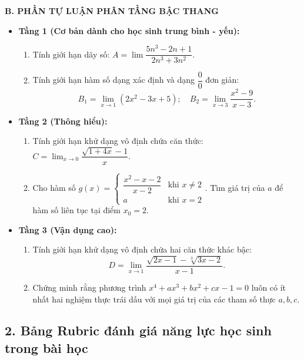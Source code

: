\documentclass[12pt, a4paper]{article}
\begin{document}
\noindent \textbf{B. PHẦN TỰ LUẬN PHÂN TẦNG BẬC THANG}
\begin{itemize}[leftmargin=0.6cm]
    \item \textbf{Tầng 1 (Cơ bản dành cho học sinh trung bình - yếu):}
    \begin{enumerate}[leftmargin=0.5cm]
        \item Tính giới hạn dãy số: $A = \lim \dfrac{5n^3 - 2n + 1}{2n^3 + 3n^2}$.
        \item Tính giới hạn hàm số dạng xác định và dạng $\dfrac{0}{0}$ đơn giản:
        $$B_1 = \lim_{x \to 1} (2x^2 - 3x + 5); \quad B_2 = \lim_{x \to 3} \dfrac{x^2 - 9}{x - 3}.$$
    \end{enumerate}

    \item \textbf{Tầng 2 (Thông hiểu):}
    \begin{enumerate}[leftmargin=0.5cm]
        \item Tính giới hạn khử dạng vô định chứa căn thức: $C = \lim_{x \to 0} \dfrac{\sqrt{1 + 4x} - 1}{x}$.
        \item Cho hàm số $g(x) = \begin{cases} \dfrac{x^2 - x - 2}{x - 2} & \text{khi } x \neq 2 \\ a & \text{khi } x = 2 \end{cases}$. Tìm giá trị của $a$ để hàm số liên tục tại điểm $x_0 = 2$.
    \end{enumerate}

    \item \textbf{Tầng 3 (Vận dụng cao):}
    \begin{enumerate}[leftmargin=0.5cm]
        \item Tính giới hạn khử dạng vô định chứa hai căn thức khác bậc:
        $$D = \lim_{x \to 1} \dfrac{\sqrt{2x - 1} - \sqrt[3]{3x - 2}}{x - 1}.$$
        \item Chứng minh rằng phương trình $x^4 + ax^3 + bx^2 + cx - 1 = 0$ luôn có ít nhất hai nghiệm thực trái dấu với mọi giá trị của các tham số thực $a, b, c$.
    \end{enumerate}
\end{itemize}

\subsection*{2. Bảng Rubric đánh giá năng lực học sinh trong bài học}
\end{document}
